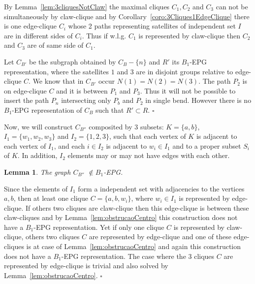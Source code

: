 \documentclass[9pt]{entcs}
\newtheorem{lema}{Lemma}[section]
\begin{document}
\begin{pf}
By Lemma~\ref{lem:3cliquesNotClaw} the maximal cliques $C_1, C_2$ and $C_3$ can not be simultaneously by claw-clique and by Corollary~\ref{coro:3Cliques1EdgeClique} there is one edge-clique $C_i$ whose 2 paths representing satellites of independent set $I$ are in different sides of  $C_i$. Thus if w.l.g. $C_1$ is represented by claw-clique then $C_2$ and $C_3$ are of same side of $C_1$.


Let $C_{B'}$ be the subgraph obtained by $C_{B}-\{n\}$ and $R'$ its $B_1$-EPG representation, where the satellites $1$ and $3$ are in disjoint groups relative to edge-clique $C$. 
 We know that in $C_{B'}$ occur  $N(1) = N(2) = N(3)$. The path $P_{2}$ is on edge-clique $C$ and it is between  $P_{1}$ and $P_{3}$. %
 Thus it will not be possible to insert the path $P_{n}$ intersecting only $P_{b}$ and $P_{2}$ in single bend. However there is no $B_1$-EPG representation of $C_{B}$ such that $R' \subset R$. $\square$

 \end{pf} 

Now, we will construct $C_{B''}$ composited by 3 subsets: $K=\{a,b\}$, $I_1=\{w_1,w_2,w_3\}$  and
$I_2=\{1,2,3\}$, such that each vertex of $K$ is adjacent to each vertex of $I_1$, and each  $i\in I_2$ is adjacent to $w_i\in I_1$ and to a proper subset $S_i$ of $K$. In addition, $I_2$ elements may or may not have edges with each other.


\begin{lema}\label{lem:cb''}
The graph $C_{B''}$  $\notin B_1$-EPG.
\end{lema}

\begin{pf}
Since the elements of $I_1$ form a independent set with adjacencies to the vertices $a,b$, then at least one clique $C = \{a,b,w_i\}$, where $w_i \in I_1$ is represented by edge-clique. If others two cliques are claw-clique then this edge-clique is between these claw-cliques and by Lemma~\ref{lem:obstrucaoCentro} this construction does  not have a $B_1$-EPG representation. Yet if only one clique $C$ is represented by claw-clique, others two cliques $C$ are represented by edge-clique and one of these edge-cliques is at case of Lemma~\ref{lem:obstrucaoCentro} and again this construction does  not have a $B_1$-EPG representation. %
The case where the 3 cliques $C$ are represented by edge-clique is trivial and also solved by Lemma~\ref{lem:obstrucaoCentro}.
 $\square$\end{pf} 
\end{document}
